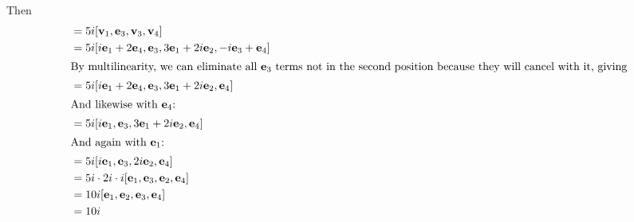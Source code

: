 Then
\begin{align*}
	[\vb v_1, \vb v_2, \vb v_3, \vb v_4]
	 & = 5i[\vb v_1, \vb e_3, \vb v_3, \vb v_4]                                      \\
	 & = 5i[i\vb e_1 + 2\vb e_4, \vb e_3, 3\vb e_1 + 2i\vb e_2, -i\vb e_3 + \vb e_4] \\
	\intertext{By multilinearity, we can eliminate all \(\vb e_3\) terms not in the second position because they will cancel with it, giving}
	 & = 5i[i\vb e_1 + 2\vb e_4, \vb e_3, 3\vb e_1 + 2i\vb e_2, \vb e_4]             \\
	\intertext{And likewise with \(\vb e_4\):}
	 & = 5i[i\vb e_1, \vb e_3, 3\vb e_1 + 2i\vb e_2, \vb e_4]                        \\
	\intertext{And again with \(\vb e_1\):}
	 & = 5i[i\vb e_1, \vb e_3, 2i\vb e_2, \vb e_4]                                   \\
	 & = 5i\cdot 2i \cdot i[\vb e_1, \vb e_3, \vb e_2, \vb e_4]                      \\
	 & = 10i[\vb e_1, \vb e_2, \vb e_3, \vb e_4]                                     \\
	 & = 10i
\end{align*}
